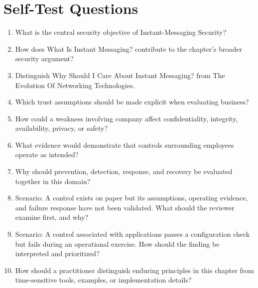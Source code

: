\documentclass[11pt]{article}
\begin{document}
\section*{Self-Test Questions}
\begin{enumerate}
\item What is the central security objective of Instant-Messaging Security?
\item How does What Is Instant Messaging? contribute to the chapter's broader security argument?
\item Distinguish Why Should I Care About Instant Messaging? from The Evolution Of Networking Technologies.
\item Which trust assumptions should be made explicit when evaluating business?
\item How could a weakness involving company affect confidentiality, integrity, availability, privacy, or safety?
\item What evidence would demonstrate that controls surrounding employees operate as intended?
\item Why should prevention, detection, response, and recovery be evaluated together in this domain?
\item Scenario: A control exists on paper but its assumptions, operating evidence, and failure response have not been validated. What should the reviewer examine first, and why?
\item Scenario: A control associated with applications passes a configuration check but fails during an operational exercise. How should the finding be interpreted and prioritized?
\item How should a practitioner distinguish enduring principles in this chapter from time-sensitive tools, examples, or implementation details?
\end{enumerate}
\end{document}
